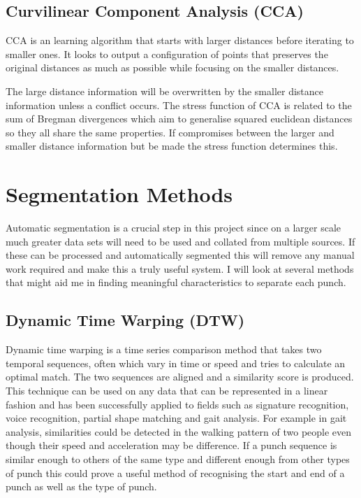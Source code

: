 \subsection{Curvilinear Component Analysis (CCA)}
CCA is an learning algorithm that starts with larger distances before iterating to smaller ones.\cite{Demartines1997} It looks to output a configuration of points that preserves the original distances as much as possible while focusing on the smaller distances.

The large distance information will be overwritten by the smaller distance information unless a conflict occurs. The stress function of CCA is related to the sum of Bregman divergences which aim to generalise squared euclidean distances so they all share the same properties. If compromises between the larger and smaller distance information but be made the stress function determines this.

\section{Segmentation Methods}
Automatic segmentation is a crucial step in this project since on a larger scale much greater data sets will need to be used and collated from multiple sources. If these can be processed and automatically segmented this will remove any manual work required and make this a truly useful system. I will look at several methods that might aid me in finding meaningful characteristics to separate each punch.

\subsection{Dynamic Time Warping (DTW)}
Dynamic time warping is a time series comparison method that takes two temporal sequences, often which vary in time or speed and tries to calculate an optimal match. The two sequences are aligned and a similarity score is produced. This technique can be used on any data that can be represented in a linear fashion and has been successfully applied to fields such as signature recognition, voice recognition, partial shape matching and gait analysis. For example in gait analysis, similarities could be detected in the walking pattern of two people even though their speed and acceleration may be difference.
If a punch sequence is similar enough to others of the same type and different enough from other types of punch this could prove a useful method of recognising the start and end of a punch as well as the type of punch.

